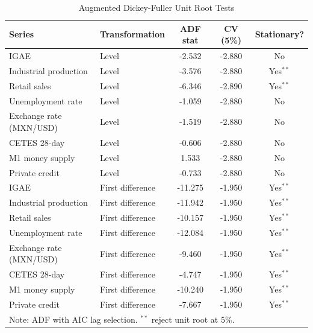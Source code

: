 \begin{table}[htbp]
  \centering
  \caption{Augmented Dickey-Fuller Unit Root Tests}
  \label{tab:adf}
  \begin{tabular}{llccc}
    \hline\hline
    Series & Transformation & ADF stat & CV (5\%) & Stationary? \\
    \hline
    IGAE & Level & -2.532 & -2.880 & No \\
    Industrial production & Level & -3.576 & -2.880 & Yes$^{**}$ \\
    Retail sales & Level & -6.346 & -2.890 & Yes$^{**}$ \\
    Unemployment rate & Level & -1.059 & -2.880 & No \\
    Exchange rate (MXN/USD) & Level & -1.519 & -2.880 & No \\
    CETES 28-day & Level & -0.606 & -2.880 & No \\
    M1 money supply & Level & 1.533 & -2.880 & No \\
    Private credit & Level & -0.733 & -2.880 & No \\
    IGAE & First difference & -11.275 & -1.950 & Yes$^{**}$ \\
    Industrial production & First difference & -11.942 & -1.950 & Yes$^{**}$ \\
    Retail sales & First difference & -10.157 & -1.950 & Yes$^{**}$ \\
    Unemployment rate & First difference & -12.084 & -1.950 & Yes$^{**}$ \\
    Exchange rate (MXN/USD) & First difference & -9.460 & -1.950 & Yes$^{**}$ \\
    CETES 28-day & First difference & -4.747 & -1.950 & Yes$^{**}$ \\
    M1 money supply & First difference & -10.240 & -1.950 & Yes$^{**}$ \\
    Private credit & First difference & -7.667 & -1.950 & Yes$^{**}$ \\
    \hline
    \multicolumn{5}{l}{\footnotesize Note: ADF with AIC lag selection. $^{**}$ reject unit root at 5\%.} \\
    \hline\hline
  \end{tabular}
\end{table}
